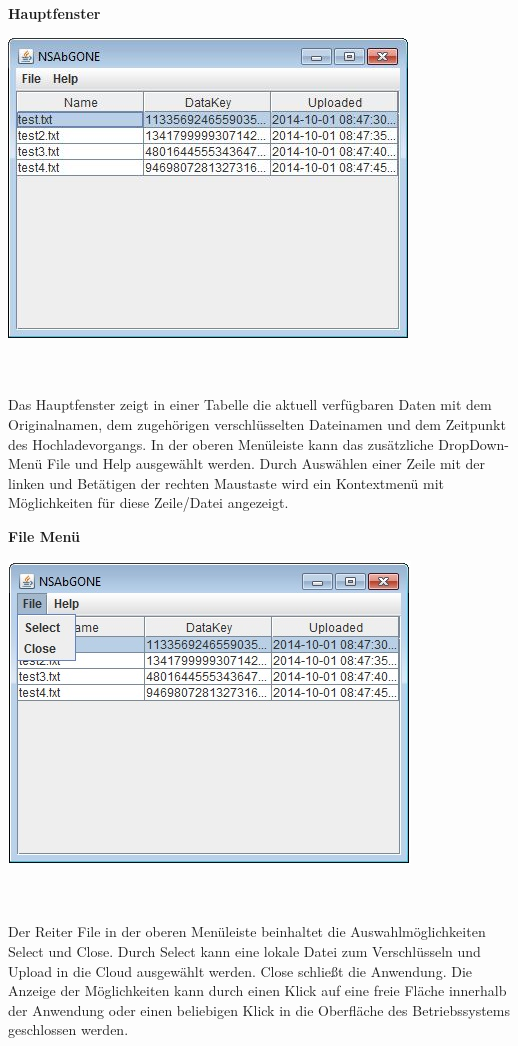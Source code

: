 \documentclass[12pt,a4paper,bibliography=totocnumbered,listof=totocnumbered]{scrartcl}
\begin{document}
\textbf{Hauptfenster}
\vspace{1em}
$\;$\\
\begin{minipage}{\linewidth}
	\centering
	\includegraphics[width=0.4\linewidth]{./img/Main.jpg}
	\label{Main}
\end{minipage}
\\\\Das Hauptfenster zeigt in einer Tabelle die aktuell verfügbaren Daten mit dem Originalnamen, dem zugehörigen verschlüsselten Dateinamen und dem Zeitpunkt des Hochladevorgangs. In der oberen Menüleiste kann das zusätzliche DropDown-Menü File und Help ausgewählt werden. Durch Auswählen einer Zeile mit der linken und Betätigen der rechten Maustaste wird ein Kontextmenü mit Möglichkeiten für diese Zeile/Datei angezeigt.

\textbf{File Menü}
\vspace{1em}
$\;$\\
\begin{minipage}{\linewidth}
	\centering
	\includegraphics[width=0.4\linewidth]{./img/File.jpg}
	\label{File}
\end{minipage}
\\\\Der Reiter File in der oberen Menüleiste beinhaltet die Auswahlmöglichkeiten Select und Close. Durch Select kann eine lokale Datei zum Verschlüsseln und Upload in die Cloud ausgewählt werden. Close schließt die Anwendung. Die Anzeige der Möglichkeiten kann durch einen Klick auf eine freie Fläche innerhalb der Anwendung oder einen beliebigen Klick in die Oberfläche des Betriebssystems geschlossen werden.
\end{document}
